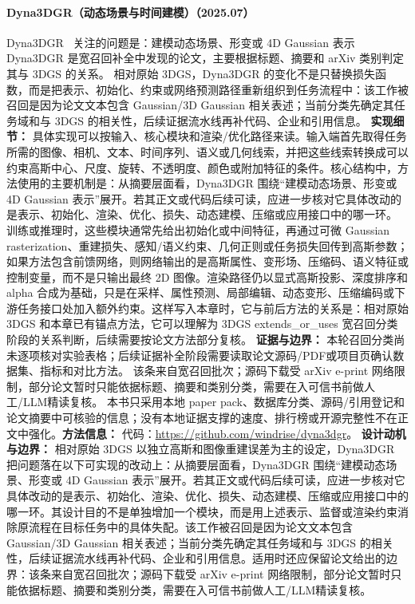 \paragraph{Dyna3DGR（动态场景与时间建模）（2025.07）}
Dyna3DGR~\cite{2507_16608} 关注的问题是：建模动态场景、形变或 4D Gaussian 表示 Dyna3DGR 是宽召回补全中发现的论文，主要根据标题、摘要和 arXiv 类别判定其与 3DGS 的关系。
相对原始 3DGS，Dyna3DGR 的变化不是只替换损失函数，而是把表示、初始化、约束或网络预测路径重新组织到任务流程中：该工作被召回是因为论文文本包含 Gaussian/3D Gaussian 相关表述；当前分类先确定其任务域和与 3DGS 的相关性，后续证据流水线再补代码、企业和引用信息。
\textbf{实现细节：} 具体实现可以按输入、核心模块和渲染/优化路径来读。输入端首先取得任务所需的图像、相机、文本、时间序列、语义或几何线索，并把这些线索转换成可以约束高斯中心、尺度、旋转、不透明度、颜色或附加特征的条件。核心结构中，方法使用的主要机制是：从摘要层面看，Dyna3DGR 围绕“建模动态场景、形变或 4D Gaussian 表示”展开。若其正文或代码后续可读，应进一步核对它具体改动的是表示、初始化、渲染、优化、损失、动态建模、压缩或应用接口中的哪一环。 训练或推理时，这些模块通常先给出初始化或中间特征，再通过可微 Gaussian rasterization、重建损失、感知/语义约束、几何正则或任务损失回传到高斯参数；如果方法包含前馈网络，则网络输出的是高斯属性、变形场、压缩码、语义特征或控制变量，而不是只输出最终 2D 图像。渲染路径仍以显式高斯投影、深度排序和 alpha 合成为基础，只是在采样、属性预测、局部编辑、动态变形、压缩编码或下游任务接口处加入额外约束。这样写入本章时，它与前后方法的关系是：相对原始 3DGS 和本章已有锚点方法，它可以理解为 3DGS extends\_or\_uses 宽召回分类阶段的关系判断，后续需要按论文方法部分复核。
\textbf{证据与边界：} 本轮召回分类尚未逐项核对实验表格；后续证据补全阶段需要读取论文源码/PDF或项目页确认数据集、指标和对比方法。 该条来自宽召回批次；源码下载受 arXiv e-print 网络限制，部分论文暂时只能依据标题、摘要和类别分类，需要在入可信书前做人工/LLM精读复核。 本书只采用本地 paper pack、数据库分类、源码/引用登记和论文摘要中可核验的信息；没有本地证据支撑的速度、排行榜或开源完整性不在正文中强化。\textbf{方法信息：} 代码：\url{https://github.com/windrise/dyna3dgr}。
\textbf{设计动机与边界：} 相对原始 3DGS 以独立高斯和图像重建误差为主的设定，Dyna3DGR 把问题落在以下可实现的改动上：从摘要层面看，Dyna3DGR 围绕“建模动态场景、形变或 4D Gaussian 表示”展开。若其正文或代码后续可读，应进一步核对它具体改动的是表示、初始化、渲染、优化、损失、动态建模、压缩或应用接口中的哪一环。其设计目的不是单独增加一个模块，而是用上述表示、监督或渲染约束消除原流程在目标任务中的具体失配。该工作被召回是因为论文文本包含 Gaussian/3D Gaussian 相关表述；当前分类先确定其任务域和与 3DGS 的相关性，后续证据流水线再补代码、企业和引用信息。适用时还应保留论文给出的边界：该条来自宽召回批次；源码下载受 arXiv e-print 网络限制，部分论文暂时只能依据标题、摘要和类别分类，需要在入可信书前做人工/LLM精读复核。
